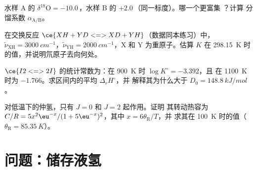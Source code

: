 \begin{exercise}[$\star\star$]\label{exo:b3:statistical-thermo-applied:9}
水样 A 的 $\delta^{18}\mathrm O = -10.0$\,\textperthousand，水样 B 的
$+2.0$\,\textperthousand（同一标度）。哪一个更富集 ？计算
分馏系数 $\alpha_{\mathrm{A/B}}$。
\end{exercise}

\begin{exercise}[$\star\star\star$]\label{exo:b3:statistical-thermo-applied:10}
在交换反应 $\ce{XH + YD <=> XD + YH}$（数据同本练习）中，$\tilde\nu_{\mathrm{XH}} =
\qty{3000}{cm^{-1}}$，$\tilde\nu_{\mathrm{YH}} = \qty{2000}{cm^{-1}}$，X 和 Y 为重原子。估算 $K$ 在
\qty{298.15}{K} 时的值，并说明氘原子去向何处。
\end{exercise}

\begin{exercise}[$\star\star\star$]\label{exo:b3:statistical-thermo-applied:11}
$\ce{I2 <=> 2 I}$ 的统计常数为：在 \qty{900}{K} 时 $\log K^\circ = -3.392$，且
在 \qty{1100}{K} 时为 $-1.766$。求区间内的平均 $\Delta_rH^\circ$，并
解释其为什么大于 $D_0 = \qty{148.8}{kJ/mol}$。
\end{exercise}

\begin{exercise}[$\star\star\star$]\label{exo:b3:statistical-thermo-applied:12}
对低温下的仲氢，只有 $J = 0$ 和 $J = 2$ 起作用。证明
其转动热容为 $C/R = 5x^2\eu^{-x}/(1 + 5\eu^{-x})^2$，其中 $x = 6\theta_{\mathrm R}/T$，并
求其在 \qty{100}{K} 时的值（$\theta_{\mathrm R} = \qty{85.35}{K}$）。
\end{exercise}

\section{问题：储存液氢}

